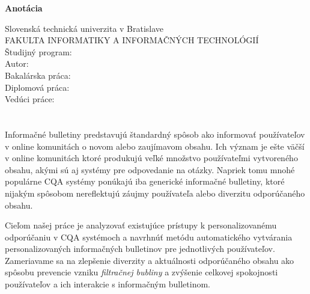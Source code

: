 \newpage
\thispagestyle{plain}
\begin{center}
\begin{Large}
\textbf{Anotácia} \\
\end{Large}
\end{center}
Slovenská technická univerzita v Bratislave \\
FAKULTA INFORMATIKY A INFORMAČNÝCH TECHNOLÓGIÍ \\
\noindent
Študijný program: \Program \\
\noindent
Autor: \Author \\
{
	{Bakalárska práca: }\Title \\
}
{
	{Diplomová práca: }\Title \\
}
Vedúci práce: \Supervisor \\
\Month \Year \\
\noindent
\\
Informačné bulletiny predstavujú štandardný spôsob ako informovať používateľov v online komunitách o novom alebo zaujímavom
obsahu. Ich význam je ešte väčší v online komunitách ktoré produkujú veľké množstvo používateľmi vytvoreného obsahu,
akými sú aj systémy pre odpovedanie na otázky.
Napriek tomu mnohé populárne CQA systémy ponúkajú iba generické informačné bulletiny, ktoré nijakým spôsobom nereflektujú
záujmy používateľa alebo diverzitu odporúčaného obsahu.


Cieľom našej práce je analyzovať existujúce prístupy k personalizovanému odporúčaniu v CQA systémoch a navrhnúť metódu
automatického vytvárania personalizovaných informačných bulletinov pre jednotlivých používateľov. Zameriavame sa na zlepšenie
diverzity a aktuálnosti odporúčaného obsahu ako spôsobu prevencie vzniku \emph{filtračnej bubliny} a zvýšenie celkovej
spokojnosti používateľov a ich interakcie s informačným bulletinom.

